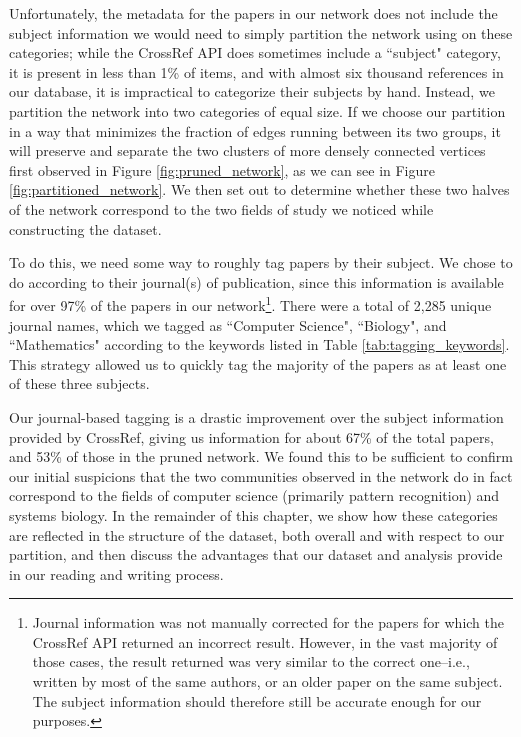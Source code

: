 \documentclass[12pt]{thesis}
\theoremstyle{plain}
\theoremstyle{definition}
\theoremstyle{remark}
\begin{document}
Unfortunately, the metadata for the papers in our network does not include the subject information we would need to simply partition the network using on these categories; while the CrossRef API does sometimes include a ``subject" category, it is present in less than 1\% of items, and with almost six thousand references in our database, it is impractical to categorize their subjects by hand. Instead, we partition the network into two categories of equal size. If we choose our partition in a way that minimizes the fraction of edges running between its two groups, it will preserve and separate the two clusters of more densely connected vertices first observed in Figure \ref{fig:pruned_network}, as we can see in Figure \ref{fig:partitioned_network}. We then set out to determine whether these two halves of the network correspond to the two fields of study we noticed while constructing the dataset.

To do this, we need some way to roughly tag papers by their subject. We chose to do according to their journal(s) of publication, since this information is available for over 97\% of the papers in our network\footnote{Journal information was not manually corrected for the papers for which the CrossRef API returned an incorrect result. However, in the vast majority of those cases, the result returned was very similar to the correct one--i.e., written by most of the same authors, or an older paper on the same subject. The subject information should therefore still be accurate enough for our purposes.}. There were a total of 2,285 unique journal names, which we tagged as ``Computer Science", ``Biology", and ``Mathematics" according to the keywords listed in Table \ref{tab:tagging_keywords}. This strategy allowed us to quickly tag the majority of the papers as at least one of these three subjects.

Our journal-based tagging is a drastic improvement over the subject information provided by CrossRef, giving us information for about 67\% of the total papers, and 53\% of those in the pruned network. We found this to be sufficient to confirm our initial suspicions that the two communities observed in the network do in fact correspond to the fields of computer science (primarily pattern recognition) and systems biology. In the remainder of this chapter, we show how these categories are reflected in the structure of the dataset, both overall and with respect to our partition, and then discuss the advantages that our dataset and analysis provide in our reading and writing process.
\end{document}
